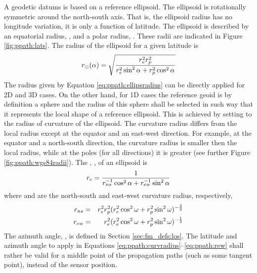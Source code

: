 A geodetic datums is based on a reference ellipsoid. The ellipsoid is rotationally symmetric around the
north-south axis. That is, the ellipsoid radius has no longitude
variation, it is only a function of latitude. The ellipsoid is
described by an equatorial radius, , and a polar radius,
. These radii are indicated in Figure \ref{fig:ppath:lats}.
The radius of the ellipsoid for a given latitude is
\begin{equation}
 r_{\odot}(\alpha) = \sqrt{\frac{r_{e}^2r_{p}^2}
                    {r_{e}^2\sin^2\alpha+r_{p}^2\cos^2\alpha}}
 \label{eq:ppath:ellipsradius} 
\end{equation}
The radius given by Equation \ref{eq:ppath:ellipsradius} can be
directly applied for 2D and 3D cases. On the other hand, for 1D cases
the reference geoid is by definition a sphere and the radius of this
sphere shall be selected in such way that it represents the local
shape of a reference ellipsoid. This is achieved by setting
\aRds{\odot} to the radius of curvature of the ellipsoid. The
curvature radius differs from the local radius except at the equator
and an east-west direction. For example, at the equator and a
north-south direction, the curvature radius is smaller then the local
radius, while at the poles (for all directions) it is greater (see
further Figure \ref{fig:ppath:wgs84radii}). 
The , , of an ellipsoid is 
\citep{rodgers:00}
\begin{equation}
 r_{c} = \frac{1}{r_{ns}^{-1}\cos^2 \alpha + r_{ew}^{-1}\sin^2 \alpha}
 \label{eq:ppath:curvradius} 
\end{equation}
where  and  are the north-south and east-west curvature radius, respectively,
\begin{eqnarray}
 r_{ns} &=& r_{e}^2r_{p}^2 (
           r_{e}^2\cos^2\omega+r_{p}^2\sin^2\omega )^{-\frac{3}{2}} \\
 r_{ew} &=& r_{e}^2 (
           r_{e}^2\cos^2\omega+r_{p}^2\sin^2\omega )^{-\frac{1}{2}} 
 \label{eq:ppath:rew} 
\end{eqnarray}
The azimuth angle, \AzmAng, is defined in
Section \ref{sec:fm_defs:los}. The latitude and azimuth angle to
apply in Equations \ref{eq:ppath:curvradius}--\ref{eq:ppath:rew}
shall rather be valid for a middle point of the propagation paths
(such as some tangent point), instead of the sensor position. 

